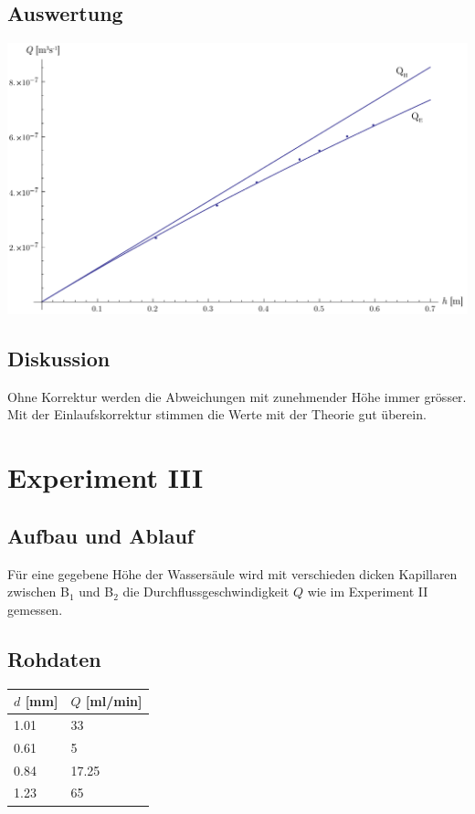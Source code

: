 \documentclass[12pt,a4paper]{article}
\newcommand{\subscript}[1]{$_{#1}$}
\newcommand{\B}[1]{B\subscript{#1}}
\begin{document}
\subsection*{Auswertung}
\begin{center}
\includegraphics[width=15cm]{diagram2.pdf}
\end{center}

\subsection*{Diskussion}
Ohne Korrektur werden die Abweichungen mit zunehmender H\"ohe immer gr\"osser. Mit der Einlaufskorrektur stimmen die Werte mit der Theorie gut \"uberein.

\section*{Experiment III}

\subsection*{Aufbau und Ablauf}
F\"ur eine gegebene H\"ohe der Wassers\"aule wird mit verschieden dicken Kapillaren zwischen \B{1} und \B{2} die Durchflussgeschwindigkeit $Q$ wie im Experiment II gemessen.

\subsection*{Rohdaten}
\begin{tabular}{|l|l|}
\hline
$d$ [mm]&$Q$ [ml/min]\\
\hline
1.01&33\\
0.61&5\\
0.84&17.25\\
1.23&65\\
\hline
\end{tabular}
\end{document}

